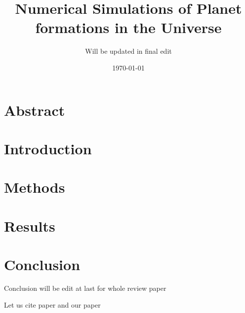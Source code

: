 \documentclass[12pt, a4paper]{article}
\title{Numerical Simulations of Planet formations in the Universe}
\author{Will be updated in final edit}
\date{\today}
\begin{document}
\maketitle

\section{Abstract}



\section{Introduction}



\section{Methods}


\section{Results}


\section{Conclusion}
Conclusion will be edit at last for whole review paper

Let us cite paper  and our paper \cite{Lines_2014}

\printbibliography
\end{document}
